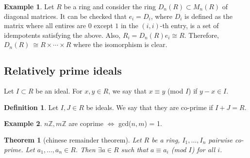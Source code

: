 \documentclass{article}
\newcommand\Z{\ensuremath{\mathbb{Z}}}
\newtheorem{theorem}{Theorem}[section]
\theoremstyle{definition}
\newtheorem{definition}{Definition}[subsection]
\newtheorem{eg}{Example}[subsection]
\theoremstyle{remark}
\theoremstyle{plain}
\begin{document}
        \begin{eg}
            Let \(R\) be a ring and consider the ring \(D_n(R) \subset M_n(R)\) of diagonal matrices. 
            It can be checked that \(e_i = D_i\), where \(D_i\) is defined as the matrix where all entires are \(0\) except \(1\) in the \((i,i)\)-th entry,
            is a set of idempotents satisfying the above. Also, \(R_i = D_n(R)e_i \cong R\). Therefore, \(D_n(R)\ \cong R \times \cdots \times R\) where the isomorphism is clear.
        \end{eg}

    \subsection{Relatively prime ideals}

    Let \(I\subset R\) be an ideal. For \(x,y \in R\), we say that \(x\equiv y\) (mod $I$) if \(y-x \in I\).

    \begin{definition}
        Let \(I, J \in R\) be ideals. We say that they are co-prime if \(I+J = R\).
    \end{definition}
    \begin{eg}
        \(n\Z, m\Z\) are coprime \(\iff\) gcd($n,m$) = 1.
    \end{eg}

    \begin{theorem}[chinese remainder theorem]
        Let \(R\) be a ring, \(I_1, \ldots, I_n\) pairwise co-prime. Let \(a_1, \ldots, a_n \in R\). Then \(\exists a\in R\) such that \(a \equiv a_i \) (mod $I$) for all \(i\).
    \end{theorem}
\end{document}
